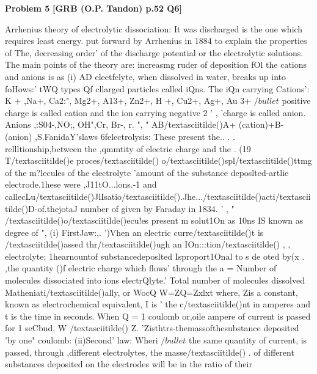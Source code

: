 \begin{problembox}
\textbf{Problem 5} \hfill \textbf{[GRB (O.P. Tandon) p.52 Q6]}
\label{q:ext-grb_all_questions-5}

Arrhenius theory of electrolytic dissociation: It was 
discharged is the one which requires least energy. 
put forward by Arrhenius in 1884 to explain the properties of 
The, decreasing order' of the discharge potential or the 
electrolytic solutions. The main points of the theory are: 
increasmg ruder of deposition fOl the cations and anions is as 
(i) AD eleetfelyte, when dissolved in water, breaks up into 
foHows:' 
tWQ types Qf cllarged particles called iQns. The iQn carrying 
Cations': K + ,Na+, Ca2:", Mg2+, A13+, Zn2+, H +, Cu2+, Ag+, Au 3+ $/bullet$ 
positive charge is called cation and the ion carrying negative 
2 
' , 
'charge is called anion. 
Anions ,:S04-,NO;, OH",Cr, Br-, r. 
", 
" 
AB/textasciitilde()A+ (cation)+B- (anion) 
,S.FanidaY'slaws 6felectrolysis: These present the.. 
. . 
rellltionship,between the ,qmmtity of electric charge and the 
. (19 T/textasciitilde()e proces/textasciitilde() o/textasciitilde()spl/textasciitilde()ttmg of the m?lecules of the electrolyte 
'amount of the substance deposlted-artlie electrode.1hese were \underline{\hspace{1cm}},\underline{\hspace{1cm}}J11tO...lons.-1 and callecLu/textasciitilde()JlIsatio/textasciitilde().Jhe.../textasciitilde()acti/textasciitilde()D-of.thejotaJ number of 
given by Faraday in 1834. ' 
, 
" 
/textasciitilde()o/textasciitilde()ecu!es present m solut1On as 10ns IS known as degree of 
", (i) FirstJaw:,. ')Vhen an electric curre/textasciitilde()t is /textasciitilde()assed thr/textasciitilde()ugh an 
IOn:::tion/textasciitilde() 
, , 
electrolyte; 1hearnountof substancedeposlted Isproport1Onal to 
s de oted by(x . 
,the quantity ()f electric charge which flows' through the 
a = Number of molecules dissociated into ions 
electrQlyte.' 
Total number of molecules dissolved 
Matheniati/textasciitilde()ally, 
or 
WocQ 
W=ZQ=Zxlxt 
where, Zis a constant, known as electrochemical equivalent, I is ' 
the c/textasciitilde()nt in amperes and t is the time in seconds. When Q = 1 
coulomb or,oile ampere of current is passed for 1 seCbnd, W /textasciitilde() Z. 
'Zisthtrs-themassofthesubstance deposited 'by one" coulomb: 
(ii)Second' law: Wheri $/bullet$ the same quantity of current, is 
passed, through ,different electrolytes, the masse/textasciitilde() . of different 
substances deposited on the electrodes will be in the ratio of their 

\end{problembox}
